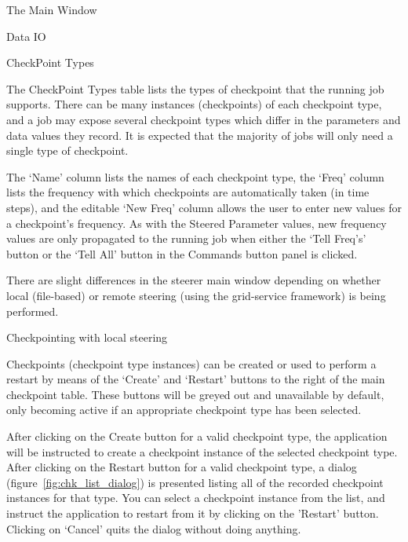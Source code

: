 \documentclass[a4paper,twoside]{article}
\begin{document}
\begin{section}{The Main Window}
\begin{subsection}{Data IO}
\end{subsection} %


\begin{subsection}{CheckPoint Types}

The CheckPoint Types table lists the types of checkpoint that the
running job supports. There can be many instances (checkpoints) of
each checkpoint type, and a job may expose several checkpoint types
which differ in the parameters and data values they record. It is expected
that the majority of jobs will only need a single type of checkpoint.

The `Name' column lists the names of each checkpoint type, the `Freq'
column lists the frequency with which checkpoints are automatically
taken (in time steps), and the editable `New Freq' column allows the user
to enter new values for a checkpoint's frequency. As with the Steered
Parameter values, new frequency values are only propagated to the
running job when either the `Tell Freq's' button or the `Tell All'
button in the Commands button panel is clicked.

There are slight differences in the steerer main window depending on
whether local (file-based) or remote steering (using the grid-service
framework) is being performed.


\begin{subsubsection}{Checkpointing with local steering}

Checkpoints (checkpoint type instances) can be created or used to
perform a restart by means of the `Create' and `Restart' buttons to
the right of the main checkpoint table. These buttons will be greyed
out and unavailable by default, only becoming active if an appropriate
checkpoint type has been selected.

After clicking on the Create button for a valid checkpoint type, the
application will be instructed to create a checkpoint instance of the
selected checkpoint type.  After clicking on the Restart button for a
valid checkpoint type, a dialog (figure~\ref{fig:chk_list_dialog}) is
presented listing all of the recorded checkpoint instances for that
type. You can select a checkpoint instance from the list, and instruct
the application to restart from it by clicking on the 'Restart'
button. Clicking on `Cancel' quits the dialog without doing anything.


\end{subsubsection}
\end{subsection}
\end{section}
\end{document}
